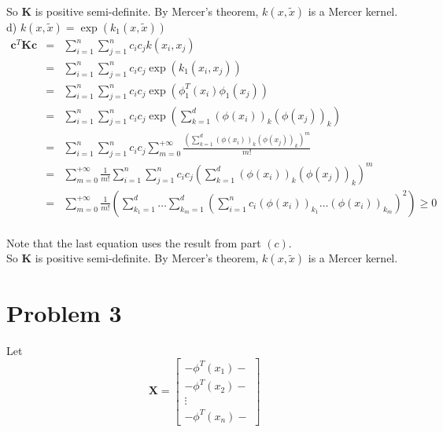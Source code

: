 \documentclass[12pt]{article}
\begin{document}
So \textbf{K} is positive semi-definite. By Mercer's theorem, $k(x, \tilde{x})$ is a Mercer kernel. \\

d) $k(x, \tilde{x}) = \exp (k_1(x, \tilde{x}))$ \\

\begin{eqnarray*}
  \textbf{c}^T \textbf{Kc}
  &=& \sum_{i=1}^n \sum_{j=1}^n c_i c_j k(x_i,x_j) \\
  &=& \sum_{i=1}^n \sum_{j=1}^n c_i c_j \exp (k_1(x_i,x_j)) \\
  &=& \sum_{i=1}^n \sum_{j=1}^n c_i c_j \exp (\phi_1^T(x_i) \phi_1(x_j)) \\
  &=& \sum_{i=1}^n \sum_{j=1}^n c_i c_j
  \exp \left( \sum_{k=1}^d (\phi(x_i))_k (\phi(x_j))_k \right) \\
  &=& \sum_{i=1}^n \sum_{j=1}^n c_i c_j \sum_{m=0}^{+\infty}
  \frac {\left( \sum_{k=1}^d (\phi(x_i))_k (\phi(x_j))_k \right)^m}{m!} \\
  &=& \sum_{m=0}^{+\infty} \frac {1}{m!} \sum_{i=1}^n \sum_{j=1}^n c_i c_j
  \left( \sum_{k=1}^d (\phi(x_i))_k (\phi(x_j))_k \right)^m \\
  &=& \sum_{m=0}^{+\infty} \frac {1}{m!} \left(
  \sum_{k_1=1}^d \dots \sum_{k_m=1}^d \left(
  \sum_{i=1}^n c_i (\phi(x_i))_{k_1} \dots (\phi(x_i))_{k_m}
  \right)^2 \right) \ge 0 \\
\end{eqnarray*}

Note that the last equation uses the result from part $(c)$. \\

So \textbf{K} is positive semi-definite. By Mercer's theorem, $k(x, \tilde{x})$ is a Mercer kernel.

\section*{Problem 3}

Let
\begin{equation*}
  \textbf{X} =
  \begin{bmatrix}
    - \phi^T(x_1)- \\
    - \phi^T(x_2)- \\
    \vdots \\
    -\phi^T(x_n)- 
  \end{bmatrix}
\end{equation*}
\end{document}
